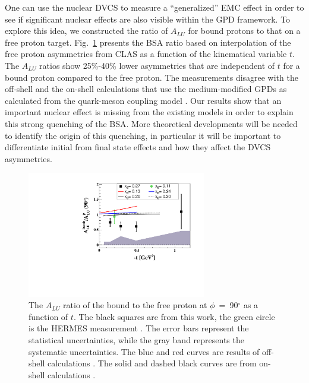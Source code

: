 \documentclass[twocolumn,nofootinbib,prl,superscriptaddress,secnumarabic,amssymb,nobibnotes,aps,floatfix]{revtex4}
\begin{document}
One can use the nuclear DVCS to measure a ``generalized'' EMC effect in order 
to see if significant nuclear effects are also visible within the GPD 
framework. To explore this idea, we constructed the ratio of $A_{LU}$ for bound 
protons to that on a free proton target.  
Fig.~\ref{fig:incoh_EMC_ratio_ALU_proton} presents the BSA ratio based on 
interpolation of the free proton asymmetries from CLAS \cite{Girod:2007aa} as a 
function of the kinematical variable $t$. The $A_{LU}$ ratios show 25\%-40\% 
lower asymmetries that are independent of $t$ for a bound proton compared to 
the free proton. The measurements disagree with the off-shell 
\cite{simonetta_2} and the on-shell calculations that use the medium-modified 
GPDs as calculated from the quark-meson coupling model \cite{Guzey:2008fe}. Our 
results show that an important nuclear effect is missing from the existing 
models in order to explain this strong quenching of the BSA. More theoretical 
developments will be needed to identify the origin of this quenching, in 
particular it will be important to differentiate initial from final state 
effects and how they affect the DVCS asymmetries.

\begin{figure}[tb]
\centering
\includegraphics[width=7.8cm]{ALU_ratioInc_t_shortscenrario-without-error-onX.pdf}
\caption{ The $A_{LU}$ ratio of the bound to the free proton at 
   $\phi$~=~90$^{\circ}$ as a function of $t$. The black squares are from this 
   work, the green circle is the HERMES measurement \cite{Airapetian:2009cga}.  
   The error bars represent the statistical uncertainties, while the gray band 
   represents the systematic uncertainties. The blue and red curves are results 
   of off-shell calculations \cite{simonetta_2}. The solid and dashed black 
   curves are from on-shell calculations \cite{Guzey:2008fe}.} 
   \label{fig:incoh_EMC_ratio_ALU_proton}
\end{figure}
\end{document}
